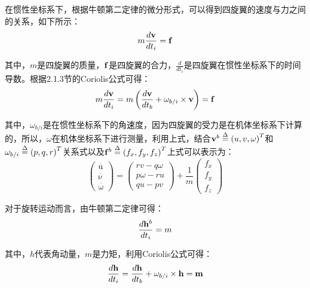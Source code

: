 在惯性坐标系下，根据牛顿第二定律的微分形式，可以得到四旋翼的速度与力之间的关系，如下所示：
\[m\frac{{d{\bf{v}}}}{{d{t_i}}} = {\bf{f}}\]

其中，$m$是四旋翼的质量，${\bf{f}}$是四旋翼的合力，$\frac{d}{{d{t_i}}}$是四旋翼在惯性坐标系下的时间导数。根据2.1.3节的Coriolis公式可得：
\begin{equation}
m\frac{{d{\bf{v}}}}{{d{t_i}}} = m\left( {\frac{{d{\bf{v}}}}{{d{t_b}}} + {\omega _{b/i}} \times {\bf{v}}} \right) = {\bf{f}}
\end{equation}

其中，${\omega _{b/i}}$是在惯性坐标系下的角速度，因为四旋翼的受力是在机体坐标系下计算的，所以，$\omega$在机体坐标系下进行测量，利用上式，结合${{\bf{v}}^b} \buildrel \Delta \over = {\left( {u,v,\omega } \right)^T}$和${\omega _{b/i}} \buildrel \Delta \over = {\left( {p,q,r} \right)^T}$关系式以及${{\bf{f}}^b} \buildrel \Delta \over = {\left( {{f_x},{f_y},{f_z}} \right)^T}$上式可以表示为：
\begin{equation}
\left( \begin{array}{l}
\mathop u\limits^ \cdot  \\
\mathop \nu \limits^ \cdot  \\
\mathop \omega \limits^ \cdot
\end{array} \right) = \left( \begin{array}{l}
rv - q\omega \\
p\omega  - ru\\
qu - pv
\end{array} \right) + \frac{1}{m}\left( \begin{array}{l}
{f_x}\\
{f_y}\\
{f_z}
\end{array} \right)
\end{equation}

对于旋转运动而言，由牛顿第二定律可得：
\begin{equation}
\frac{{d{{\bf{h}}^b}}}{{d{t_i}}} = m
\end{equation}

其中，$h$代表角动量，$m$是力矩，利用Coriolis公式可得：
\[\frac{{d{\bf{h}}}}{{d{t_i}}} = \frac{{d{\bf{h}}}}{{d{t_b}}} + {\omega _{b/i}} \times {\bf{h}} = {\bf{m}}\]

